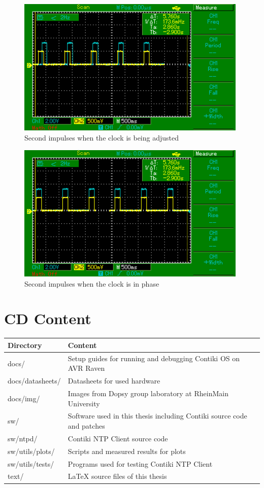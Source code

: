 \begin{figure}[H]
  \centering
  \includegraphics[width=11cm,keepaspectratio]{fig/osc-adjusting-phase.png}
  \caption{Second impulses when the clock is being adjusted}
  \label{fig:app-osc-adjusting-phase}
\end{figure}

\begin{figure}[H]
  \centering
  \includegraphics[width=11cm,keepaspectratio]{fig/osc-in-phase.png}
  \caption{Second impulses when the clock is in phase}
  \label{fig:app-osc-in-phase}
  \bigskip
\end{figure}


\chapter{CD Content}\label{app:cd-content} %
\begin{tabular}{|l|l|}
	\hline
	Directory & Content \\ \hline
	docs/ & Setup guides for running and debugging Contiki OS on AVR Raven\\
	docs/datasheets/ & Datasheets for used hardware\\
	docs/img/ & Images from Dopsy group laboratory at RheinMain University\\
	sw/ & Software used in this thesis including Contiki source code and patches\\
	sw/ntpd/ & Contiki NTP Client source code\\
	sw/utils/plots/ & Scripts and measured results for plots\\
	sw/utils/tests/ & Programs used for testing Contiki NTP Client\\
	text/ & LaTeX source files of this thesis\\
	\hline
\end{tabular}
